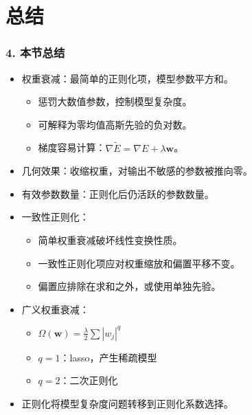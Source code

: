\documentclass[t,aspectratio=169]{beamer} %
\begin{document}
\section{总结}

\begin{frame}
    \frametitle{4. 本节总结}
    \begin{itemize}
        \item \alert{权重衰减}：最简单的正则化项，模型参数平方和。
        \begin{itemize}
            \item 惩罚大数值参数，控制模型复杂度。
            \item 可解释为零均值高斯先验的负对数。
            \item 梯度容易计算：$\nabla \widetilde{E} = \nabla E + \lambda \mathbf{w}$。
        \end{itemize}
        \item \alert{几何效果}：收缩权重，对输出不敏感的参数被推向零。
        \item \alert{有效参数数量}：正则化后仍活跃的参数数量。
        \item \alert{一致性正则化}：
        \begin{itemize}
            \item 简单权重衰减破坏线性变换性质。
            \item 一致性正则化项应对权重缩放和偏置平移不变。
            \item 偏置应排除在求和之外，或使用单独先验。
        \end{itemize}
        \item \alert{广义权重衰减}：
        \begin{itemize}
            \item $\Omega(\mathbf{w}) = \frac{\lambda}{2} \sum |w_j|^q$
            \item $q = 1$：lasso，产生\alert{稀疏}模型
            \item $q = 2$：二次正则化
        \end{itemize}
        \item 正则化将模型复杂度问题\alert{转移}到正则化系数选择。
    \end{itemize}
\end{frame}

\end{document}
